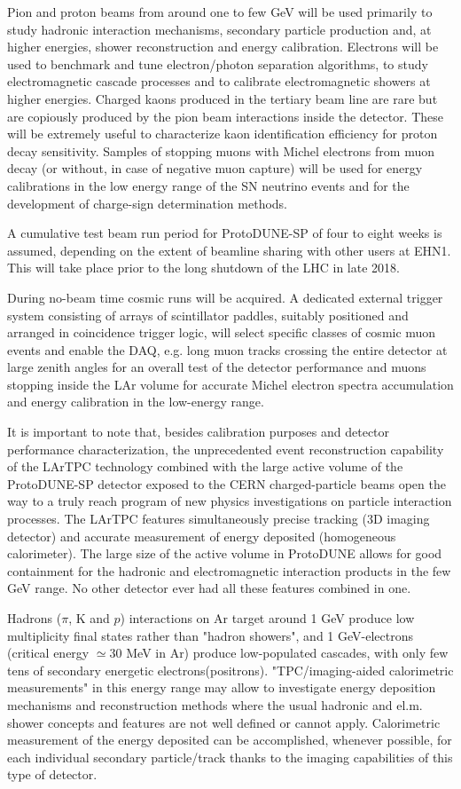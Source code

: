Pion and proton beams from around one to few GeV will be used primarily to study hadronic interaction mechanisms, secondary particle production and, at higher energies, shower reconstruction and energy calibration. Electrons will be used to benchmark and tune electron/photon separation algorithms, to study electromagnetic cascade processes and to calibrate electromagnetic showers at higher energies. Charged kaons produced in the tertiary beam line are rare but are copiously produced by the pion beam interactions inside the detector. These will be extremely useful to characterize kaon identification efficiency for proton decay sensitivity.  Samples of stopping muons with Michel electrons from muon decay (or without, in case of negative muon capture) will be used for energy calibrations in the low energy range of the SN neutrino events and for the development of charge-sign determination methods. 

A cumulative test beam run period for ProtoDUNE-SP of four to eight weeks is assumed, depending on the extent of beamline sharing with other users at EHN1. This will take place prior to the long shutdown of the LHC in late 2018. 

During no-beam time cosmic runs will be acquired. A dedicated external trigger system consisting of arrays of scintillator paddles, suitably positioned and arranged in coincidence trigger logic, will select specific classes of cosmic muon events and enable the DAQ, e.g. long muon tracks crossing the entire detector at large zenith angles for an overall test of the detector performance and muons stopping inside the LAr volume for accurate Michel electron spectra accumulation and energy calibration in the low-energy range.

It is important to note that, besides calibration purposes and detector performance characterization, the unprecedented event reconstruction capability of the LArTPC technology combined with the large active volume of the ProtoDUNE-SP detector exposed to the CERN charged-particle beams open the way to a truly reach program of new physics investigations on particle interaction processes. 
  The LArTPC features simultaneously precise tracking (3D imaging detector) and accurate measurement of energy deposited (homogeneous calorimeter). The large size of the active volume in ProtoDUNE allows for good containment for the hadronic and electromagnetic interaction products in the few GeV range. No other detector ever had all these features combined in one. 
 
 Hadrons ($\pi$, K and $p$) interactions on Ar target around 1 GeV produce low multiplicity final states rather than "hadron showers", 
 and 1 GeV-electrons  (critical energy $\simeq 30$ MeV in Ar) produce low-populated cascades, with only few tens of secondary energetic electrons(positrons). 
"TPC/imaging-aided calorimetric measurements" in this energy range may allow to investigate 
energy deposition mechanisms and reconstruction methods where the usual hadronic and el.m. shower concepts and features are not well defined or cannot apply.
Calorimetric measurement of the energy deposited can be accomplished,  whenever possible, for each individual secondary particle/track thanks to the imaging capabilities of this type of detector.

